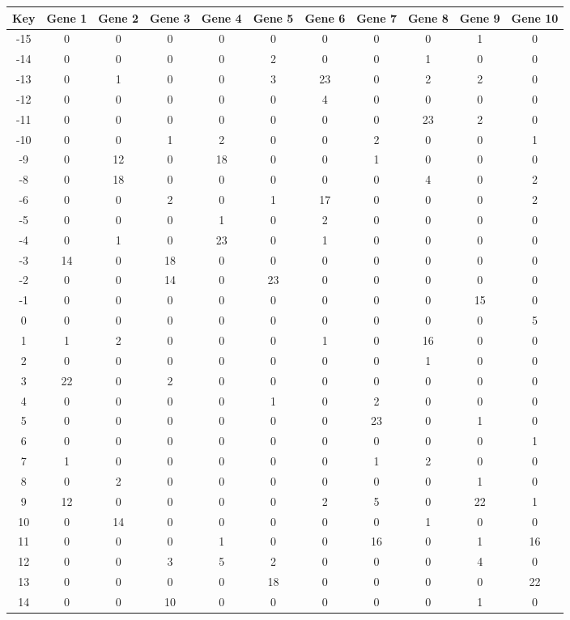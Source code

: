 \begin{tabular}{|c|c|c|c|c|c|c|c|c|c|c|}
\hline
Key & Gene 1 & Gene 2 & Gene 3 & Gene 4 & Gene 5 & Gene 6 & Gene 7 & Gene 8 & Gene 9 & Gene 10 \\
\hline
-15 & 0 & 0 & 0 & 0 & 0 & 0 & 0 & 0 & 1 & 0 \\
-14 & 0 & 0 & 0 & 0 & 2 & 0 & 0 & 1 & 0 & 0 \\
-13 & 0 & 1 & 0 & 0 & 3 & 23 & 0 & 2 & 2 & 0 \\
-12 & 0 & 0 & 0 & 0 & 0 & 4 & 0 & 0 & 0 & 0 \\
-11 & 0 & 0 & 0 & 0 & 0 & 0 & 0 & 23 & 2 & 0 \\
-10 & 0 & 0 & 1 & 2 & 0 & 0 & 2 & 0 & 0 & 1 \\
-9 & 0 & 12 & 0 & 18 & 0 & 0 & 1 & 0 & 0 & 0 \\
-8 & 0 & 18 & 0 & 0 & 0 & 0 & 0 & 4 & 0 & 2 \\
-6 & 0 & 0 & 2 & 0 & 1 & 17 & 0 & 0 & 0 & 2 \\
-5 & 0 & 0 & 0 & 1 & 0 & 2 & 0 & 0 & 0 & 0 \\
-4 & 0 & 1 & 0 & 23 & 0 & 1 & 0 & 0 & 0 & 0 \\
-3 & 14 & 0 & 18 & 0 & 0 & 0 & 0 & 0 & 0 & 0 \\
-2 & 0 & 0 & 14 & 0 & 23 & 0 & 0 & 0 & 0 & 0 \\
-1 & 0 & 0 & 0 & 0 & 0 & 0 & 0 & 0 & 15 & 0 \\
0 & 0 & 0 & 0 & 0 & 0 & 0 & 0 & 0 & 0 & 5 \\
1 & 1 & 2 & 0 & 0 & 0 & 1 & 0 & 16 & 0 & 0 \\
2 & 0 & 0 & 0 & 0 & 0 & 0 & 0 & 1 & 0 & 0 \\
3 & 22 & 0 & 2 & 0 & 0 & 0 & 0 & 0 & 0 & 0 \\
4 & 0 & 0 & 0 & 0 & 1 & 0 & 2 & 0 & 0 & 0 \\
5 & 0 & 0 & 0 & 0 & 0 & 0 & 23 & 0 & 1 & 0 \\
6 & 0 & 0 & 0 & 0 & 0 & 0 & 0 & 0 & 0 & 1 \\
7 & 1 & 0 & 0 & 0 & 0 & 0 & 1 & 2 & 0 & 0 \\
8 & 0 & 2 & 0 & 0 & 0 & 0 & 0 & 0 & 1 & 0 \\
9 & 12 & 0 & 0 & 0 & 0 & 2 & 5 & 0 & 22 & 1 \\
10 & 0 & 14 & 0 & 0 & 0 & 0 & 0 & 1 & 0 & 0 \\
11 & 0 & 0 & 0 & 1 & 0 & 0 & 16 & 0 & 1 & 16 \\
12 & 0 & 0 & 3 & 5 & 2 & 0 & 0 & 0 & 4 & 0 \\
13 & 0 & 0 & 0 & 0 & 18 & 0 & 0 & 0 & 0 & 22 \\
14 & 0 & 0 & 10 & 0 & 0 & 0 & 0 & 0 & 1 & 0 \\
\hline
\end{tabular}